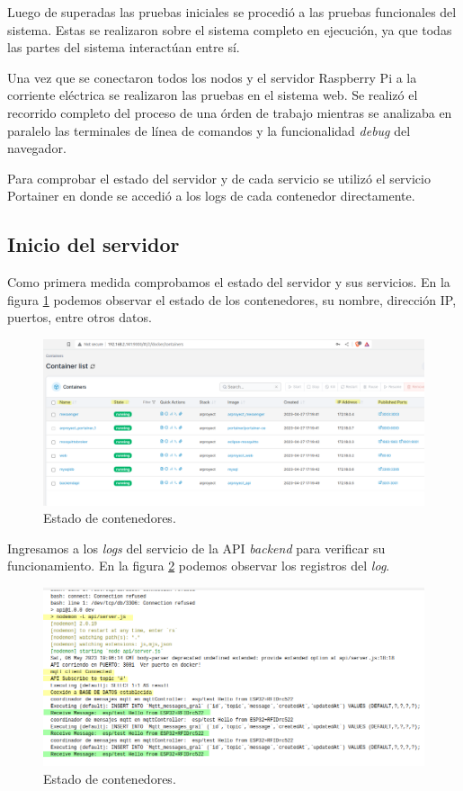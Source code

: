 Luego de superadas las pruebas iniciales se procedió a las pruebas funcionales del sistema. Estas se realizaron sobre el sistema completo en ejecución, ya que todas las partes del sistema interactúan entre sí. 

Una vez que se conectaron todos los nodos y el servidor Raspberry Pi a la corriente eléctrica se realizaron las pruebas en el sistema web. Se realizó el recorrido completo del proceso de una órden de trabajo mientras se analizaba en paralelo las terminales de línea de comandos y la funcionalidad \textit{debug} del navegador.

Para comprobar el estado del servidor y de cada servicio se utilizó el servicio Portainer en donde se accedió a los logs de cada contenedor directamente.

\subsection{Inicio del servidor}
\label{subsec:ensayoservidor}

Como primera medida comprobamos el estado del servidor y sus servicios. En la figura \ref{fig:ensayoportainer3} podemos observar el estado de los contenedores, su nombre, dirección IP, puertos, entre otros datos.

\begin{figure}[H]
	\centering
	\includegraphics[scale=.35]{./Figures/ensayo-1/3.portainer.png}
	\caption{Estado de contenedores.}
	\label{fig:ensayoportainer3}
\end{figure}

Ingresamos a los \textit{logs} del servicio de la API \textit{backend} para verificar su funcionamiento.  En la figura \ref{fig:ensayoportainerlogapi} podemos observar los registros del \textit{log}.

\begin{figure}[H]
	\centering
	\includegraphics[width=\textwidth]{./Figures/ensayo-1/4.portainer-log-api.png}
	\caption{Estado de contenedores.}
	\label{fig:ensayoportainerlogapi}
\end{figure}


